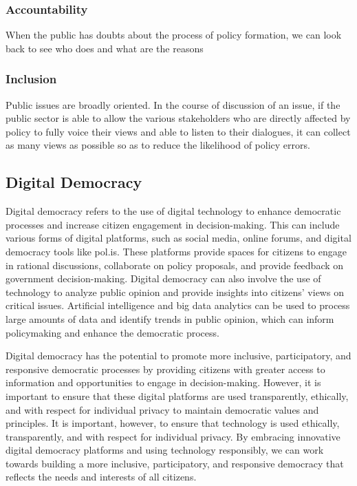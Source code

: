 \documentclass{IEEEtran}
\begin{document}
\subsubsection{Accountability}
When the public has doubts about the process of policy formation, we can look back to see who does and what are the reasons   
\subsubsection{Inclusion}
Public issues are broadly oriented. In the course of discussion of an issue, if the public sector is able to allow the various stakeholders who are directly affected by policy to fully voice their views and able to listen to their dialogues, it can collect as many views as possible so as to reduce the likelihood of policy errors. 


\subsection{Digital Democracy}
Digital democracy refers to the use of digital technology to enhance democratic processes and increase citizen engagement in decision-making. This can include various forms of digital platforms, such as social media, online forums, and digital democracy tools like pol.is. These platforms provide spaces for citizens to engage in rational discussions, collaborate on policy proposals, and provide feedback on government decision-making.
Digital democracy can also involve the use of technology to analyze public opinion and provide insights into citizens' views on critical issues. Artificial intelligence and big data analytics can be used to process large amounts of data and identify trends in public opinion, which can inform policymaking and enhance the democratic process.

Digital democracy has the potential to promote more inclusive, participatory, and responsive democratic processes by providing citizens with greater access to information and opportunities to engage in decision-making. However, it is important to ensure that these digital platforms are used transparently, ethically, and with respect for individual privacy to maintain democratic values and principles.
It is important, however, to ensure that technology is used ethically, transparently, and with respect for individual privacy. By embracing innovative digital democracy platforms and using technology responsibly, we can work towards building a more inclusive, participatory, and responsive democracy that reflects the needs and interests of all citizens.
\end{document}
